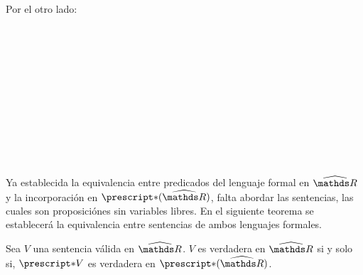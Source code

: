 \begin{demo}
  Por el otro lado:
  \begin{longderivation}
      \\
    \equiv\\
      \\
    \equiv\\
    \\
    \\
      \\
    \equiv\\
      \\
    \equiv\\
  \end{longderivation}
\end{demo}

Ya establecida la equivalencia entre predicados del lenguaje formal
en $\Rh$ y la incorporación en $\st{(\Rh)}$, falta abordar las sentencias,
las cuales son proposiciónes sin variables libres. En el siguiente
teorema se establecerá la equivalencia entre sentencias de ambos
lenguajes formales.

\begin{theorem}
  Sea $V$ una sentencia válida en $\Rh$. $V$ es verdadera en $\Rh$ si y
  solo si, $\st{V}$ es verdadera en $\st{(\Rh)}$.
\end{theorem}

